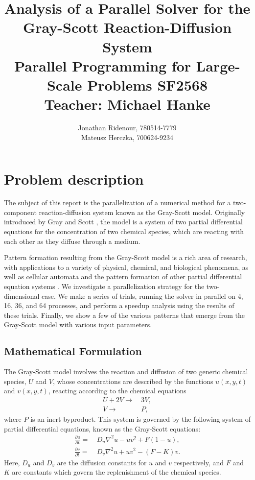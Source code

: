 \documentclass[a4paper,11pt]{article}
\title{ Analysis of a Parallel Solver for the Gray-Scott Reaction-Diffusion System\\ 
\vspace{1.2cm}
\large Parallel Programming for Large-Scale Problems SF2568 \\ 
Teacher: Michael Hanke}
\author{Jonathan Ridenour, 780514-7779\\
Mateusz Herczka, 700624-9234}
\newcommand{\ba}[1]{\begin{align*}    #1    \end{align*}}
\newcommand{\ban}[1]{\begin{align}    #1    \end{align}}
\begin{document}
\maketitle
\pagebreak
\section*{Problem description}
The subject of this report is the parallelization of a numerical method for a two-component reaction-diffusion system known as the Gray-Scott model.  Originally introduced by Gray and Scott \cite{Gray}, the model is a system of two partial differential equations for the concentration of two chemical species, which are reacting with each other as they diffuse through a medium.

Pattern formation resulting from the Gray-Scott model is a rich area of research, with applications to a variety of physical, chemical, and biological phenomena, as well as cellular automata and the pattern formation of other partial differential equation systems \cite{Wang}.  We investigate a parallelization strategy for the two-dimensional case.  We make a series of trials, running the solver in parallel on 4, 16, 36, and 64 processes, and perform a speedup analysis using the results of these trials. Finally, we show a few of the various patterns that emerge from the Gray-Scott model with various input parameters.

\subsection*{Mathematical Formulation}
The Gray-Scott model involves the reaction and diffusion of two generic chemical species, $U$ and $V$, whose concentrations are described by the functions $u(x, y, t)$ and $v(x,y,t)$, reacting according to the chemical equations
\ba{
U + 2V \rightarrow  & \ 3V,\\
V \rightarrow  & \ P,
}
where $P$ is an inert byproduct.  This system is governed by the following system of partial differential equations, known as the Gray-Scott equations:
\begingroup
\addtolength{\jot}{0.5 em}
\ban{
\label{eq:gsu}
\frac{\partial u}{\partial t} = & \ D_u \nabla^2u - uv^2 + F(1-u),\\
\label{eq:gsv}
\frac{\partial v}{\partial t} = & \ D_v \nabla^2u + uv^2 - (F-K)v.
}
\endgroup
Here, $D_u$ and $D_v$ are the diffusion constants for $u$ and $v$ respectively, and $F$ and $K$ are constants which govern the replenishment of the chemical species.
\end{document}
